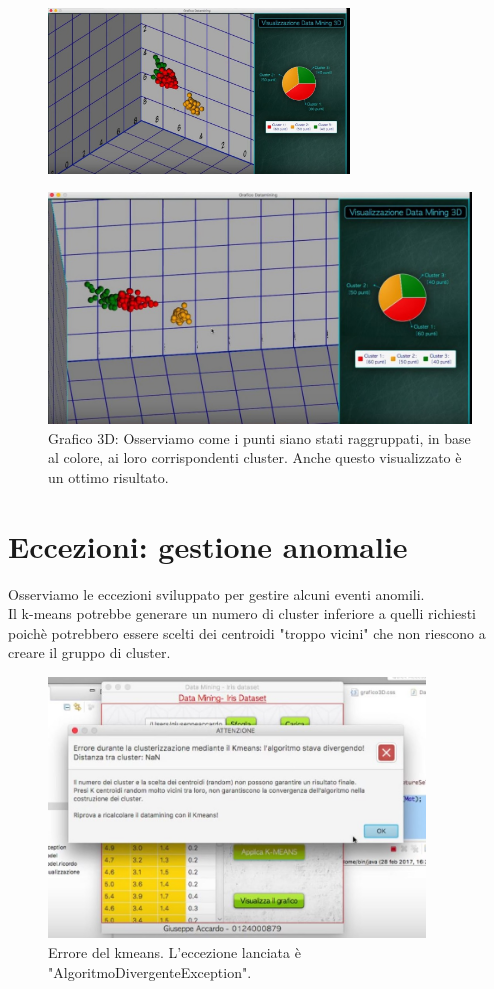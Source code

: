 \documentclass[a4paper, oneside]{book}
\begin{document}
\begin{figure}[htp]
\centering
\includegraphics[width=8cm]{19.bmp}
\end{figure}
\begin{figure}[htp]
\centering
\includegraphics[width=13cm]{20.bmp}
\caption{Grafico 3D: Osserviamo come i punti siano stati raggruppati, in base al colore, ai loro corrispondenti cluster. Anche questo visualizzato è un ottimo risultato. }
\label{fig:grafico 3D}
\end{figure}

\newpage
\large
\section*{Eccezioni: gestione anomalie}
Osserviamo le eccezioni sviluppato per gestire alcuni eventi anomili.\\
Il k-means potrebbe generare un numero di cluster inferiore a quelli richiesti poichè potrebbero essere scelti dei centroidi "troppo vicini" che non riescono a creare il gruppo di cluster.
\begin{figure}[htp]
\centering
\includegraphics[width=10cm]{13.bmp}
\caption{Errore del kmeans. L'eccezione lanciata è "AlgoritmoDivergenteException".}
\label{fig:ecc kmeans}
\end{figure}
\end{document}
